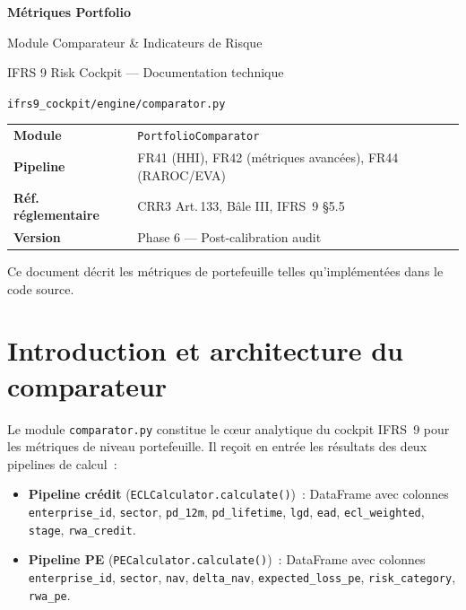 \documentclass[12pt,a4paper]{article}
\begin{document}
\begin{titlepage}
\centering
\vspace*{3cm}
{\Huge\bfseries\color{darkblue} M\'etriques Portfolio\par}
\vspace{0.5cm}
{\LARGE\color{steelblue} Module Comparateur \& Indicateurs de Risque\par}
\vspace{1.5cm}
{\large\color{gray} IFRS 9 Risk Cockpit --- Documentation technique\par}
\vspace{0.5cm}
{\large\color{gray} \texttt{ifrs9\_cockpit/engine/comparator.py}\par}
\vspace{2cm}
{\normalsize
\begin{tabular}{ll}
\textbf{Module} & \texttt{PortfolioComparator} \\
\textbf{Pipeline} & FR41 (HHI), FR42 (m\'etriques avanc\'ees), FR44 (RAROC/EVA) \\
\textbf{R\'ef. r\'eglementaire} & CRR3 Art.\,133, B\^ale III, IFRS~9 \S5.5 \\
\textbf{Version} & Phase 6 --- Post-calibration audit \\
\end{tabular}
}
\vfill
{\small\color{gray} Ce document d\'ecrit les m\'etriques de portefeuille telles qu'impl\'ement\'ees dans le code source.}
\end{titlepage}

\tableofcontents
\newpage

\section{Introduction et architecture du comparateur}

Le module \texttt{comparator.py} constitue le c\oe{}ur analytique du cockpit IFRS~9 pour les m\'etriques de niveau portefeuille. Il re\c{c}oit en entr\'ee les r\'esultats des deux pipelines de calcul~:

\begin{itemize}[nosep]
    \item \textbf{Pipeline cr\'edit} (\texttt{ECLCalculator.calculate()})~: DataFrame avec colonnes \texttt{enterprise\_id}, \texttt{sector}, \texttt{pd\_12m}, \texttt{pd\_lifetime}, \texttt{lgd}, \texttt{ead}, \texttt{ecl\_weighted}, \texttt{stage}, \texttt{rwa\_credit}.
    \item \textbf{Pipeline PE} (\texttt{PECalculator.calculate()})~: DataFrame avec colonnes \texttt{enterprise\_id}, \texttt{sector}, \texttt{nav}, \texttt{delta\_nav}, \texttt{expected\_loss\_pe}, \texttt{risk\_category}, \texttt{rwa\_pe}.
\end{itemize}
\end{document}
